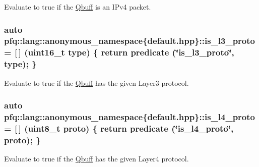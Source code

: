 Evaluate to {\ttfamily true} if the \hyperlink{structpfq_1_1lang_1_1Qbuff}{Qbuff} is an I\+Pv4 packet. 

\subsubsection[{\texorpdfstring{is\+\_\+l3\+\_\+proto}{is_l3_proto}}]{\setlength{\rightskip}{0pt plus 5cm}auto pfq\+::lang\+::anonymous\+\_\+namespace\{default.\+hpp\}\+::is\+\_\+l3\+\_\+proto = \mbox{[}$\,$\mbox{]} (uint16\+\_\+t type) \{ return {\bf predicate} (\char`\"{}is\+\_\+l3\+\_\+proto\char`\"{}, type); \}}\hypertarget{namespacepfq_1_1lang_1_1anonymous__namespace_02default_8hpp_03_a814bb9c3c833dc2af342d695b1d503e8}{}\label{namespacepfq_1_1lang_1_1anonymous__namespace_02default_8hpp_03_a814bb9c3c833dc2af342d695b1d503e8}


Evaluate to {\ttfamily true} if the \hyperlink{structpfq_1_1lang_1_1Qbuff}{Qbuff} has the given Layer3 protocol. 

\subsubsection[{\texorpdfstring{is\+\_\+l4\+\_\+proto}{is_l4_proto}}]{\setlength{\rightskip}{0pt plus 5cm}auto pfq\+::lang\+::anonymous\+\_\+namespace\{default.\+hpp\}\+::is\+\_\+l4\+\_\+proto = \mbox{[}$\,$\mbox{]} (uint8\+\_\+t proto) \{ return {\bf predicate} (\char`\"{}is\+\_\+l4\+\_\+proto\char`\"{}, proto); \}}\hypertarget{namespacepfq_1_1lang_1_1anonymous__namespace_02default_8hpp_03_a9d06d4dedca1ebdc3b270cb2f3e9e42b}{}\label{namespacepfq_1_1lang_1_1anonymous__namespace_02default_8hpp_03_a9d06d4dedca1ebdc3b270cb2f3e9e42b}


Evaluate to {\ttfamily true} if the \hyperlink{structpfq_1_1lang_1_1Qbuff}{Qbuff} has the given Layer4 protocol. 

